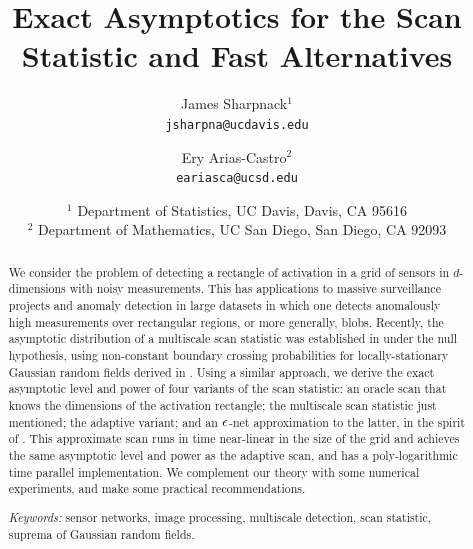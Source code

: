 \documentclass[twoside,11pt]{article}
\begin{document}
\title{Exact Asymptotics for the Scan Statistic and Fast Alternatives}
\author{
James Sharpnack$^{1}$ \\
{\tt  jsharpna@ucdavis.edu} \\
\and
Ery Arias-Castro$^{2}$\\
{\tt eariasca@ucsd.edu}\\
\and
\begin{tabular}{c}
  $^{1}$ Department of Statistics, UC Davis, Davis, CA 95616\\
  $^{2}$ Department of Mathematics, UC San Diego, San Diego, CA 92093\\
\end{tabular}
}


\date{}%
\maketitle

\begin{abstract}
We consider the problem of detecting a rectangle of activation in a grid of sensors in $d$-dimensions with noisy measurements.  
This has applications to massive surveillance projects and anomaly detection in large datasets in which one detects anomalously high measurements over rectangular regions, or more generally, blobs.  
Recently, the asymptotic distribution of a multiscale scan statistic was established in \citep{kabluchko2011extremes} under the null hypothesis, using non-constant boundary crossing probabilities for locally-stationary Gaussian random fields derived in \citep{chan2006maxima}.
Using a similar approach, we derive the exact asymptotic level and power of four variants of the scan statistic: an oracle scan that knows the dimensions of the activation rectangle; the multiscale scan statistic just mentioned; the adaptive variant; and an $\epsilon$-net approximation to the latter, in the spirit of \citep{MGD}.   
This approximate scan runs in time near-linear in the size of the grid and achieves the same asymptotic level and power as the adaptive scan, and has a poly-logarithmic time parallel implementation.
We complement our theory with some numerical experiments, and make some practical recommendations.


\medskip\noindent
{\em Keywords:} sensor networks, image processing, multiscale detection, scan statistic, suprema of Gaussian random fields.
\end{abstract}
\end{document}
